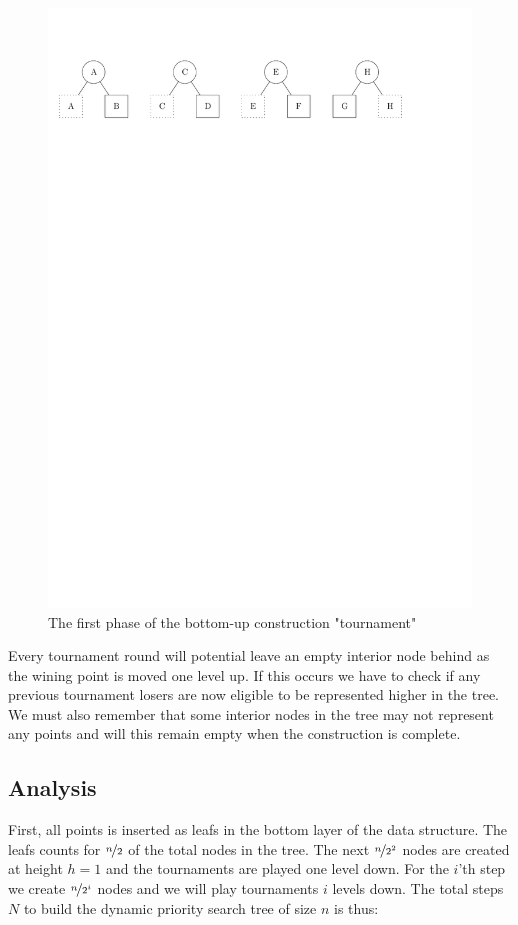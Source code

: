 \documentclass[twoside,11pt,openright]{report}
\begin{document}
\begin{figure}[h]
	\centering
	\includegraphics[scale=0.68]{../figures/internal_pst_dynamic_construction}
	\caption{The first phase of the bottom-up construction "tournament"}
	\label{fig:dynamic_pst_construction}
\end{figure}

Every tournament round will potential leave an empty interior node behind as the wining point is moved one level up. If this occurs we have to check if any previous tournament losers are now eligible to be represented higher in the tree. We must also remember that some interior nodes in the tree may not represent any points and will this remain empty when the construction is complete.

\subsection{Analysis}
First, all points is inserted as leafs in the bottom layer of the data structure. The leafs counts for $\nicefrac{n}{2}$ of the total nodes in the tree. The next $\nicefrac{n}{2^2}$ nodes are created at height $h = 1$ and the tournaments are played one level down. For the $i$'th step we create $\nicefrac{n}{2^i}$ nodes and we will play tournaments $i$ levels down. The total steps $N$ to build the dynamic priority search tree of size $n$ is thus:
\end{document}
